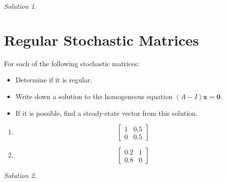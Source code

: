 \documentclass{article}
\theoremstyle{remark}
\newtheorem*{solution}{Solution}
\begin{document}
\medskip

\begin{solution}
\end{solution}

\pagebreak
\section{Regular Stochastic Matrices}

For each of the following stochastic matrices:
\begin{itemize}
\item Determine if it is regular.
\item Write down a solution to the homogeneous equation $(A - I)\mathbf x = \mathbf 0$.
\item If it is possible, find a steady-state vector from this solution.
\end{itemize}

\begin{enumerate}
\item
  \begin{displaymath}
    \begin{bmatrix}
      1 & 0.5 \\
      0 & 0.5
    \end{bmatrix}
  \end{displaymath}
\item
  \begin{displaymath}
    \begin{bmatrix}
      0.2 & 1 \\
      0.8 & 0
    \end{bmatrix}
  \end{displaymath}
\end{enumerate}

\medskip

\begin{solution}
\end{solution}
\end{document}
